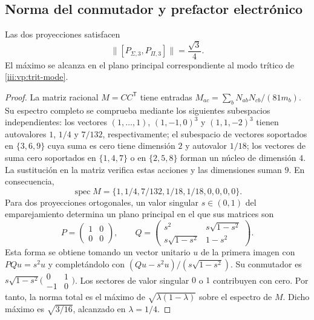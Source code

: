 \subsection{Norma del conmutador y prefactor electrónico}

\begin{theorem}
Las dos proyecciones satisfacen
\begin{equation}
 \bigl\|[P_{\Sigma,3},P_{\Pi,3}]\bigr\|=\frac{\sqrt3}{4}.
 \label{iii:vp:prefactor}
\end{equation}
El máximo se alcanza en el plano principal correspondiente al modo
trítico de \eqref{iii:vp:trit-mode}.
\end{theorem}
\begin{proof}
La matriz racional $M=CC^{\mathsf T}$ tiene entradas
$M_{ac}=\sum_bN_{ab}N_{cb}/(81m_b)$. Su espectro completo se
comprueba mediante los siguientes subespacios independientes: los
vectores $(1,\ldots,1)$, $(1,-1,0)^3$ y $(1,1,-2)^3$ tienen
autovalores $1$, $1/4$ y $7/132$, respectivamente; el subespacio de
vectores soportados en $\{3,6,9\}$ cuya suma es cero tiene dimensión
$2$ y autovalor $1/18$; los vectores de suma cero soportados en
$\{1,4,7\}$ o en $\{2,5,8\}$ forman un núcleo de dimensión $4$.
La sustitución en la matriz verifica estas acciones y las dimensiones
suman $9$. En consecuencia,
\[
 \operatorname{spec}M=
 \{1,1/4,7/132,1/18,1/18,0,0,0,0\}.
\]
Para dos proyecciones ortogonales, un valor singular $s\in(0,1)$ del
emparejamiento determina un plano principal en el que sus matrices son
\[
 P=\begin{pmatrix}1&0\\0&0\end{pmatrix},\qquad
 Q=\begin{pmatrix}s^2&s\sqrt{1-s^2}\\
 s\sqrt{1-s^2}&1-s^2\end{pmatrix}.
\]
Esta forma se obtiene tomando un vector unitario $u$ de la primera
imagen con $PQu=s^2u$ y completándolo con
$(Qu-s^2u)/(s\sqrt{1-s^2})$. Su conmutador es
$s\sqrt{1-s^2}\bigl(\begin{smallmatrix}0&1\\-1&0\end{smallmatrix}\bigr)$.
Los sectores de valor singular $0$ o $1$ contribuyen con cero.
Por tanto, la norma total es el máximo de
$\sqrt{\lambda(1-\lambda)}$ sobre el espectro de $M$. Dicho máximo
es $\sqrt{3/16}$, alcanzado en $\lambda=1/4$.
\end{proof}

